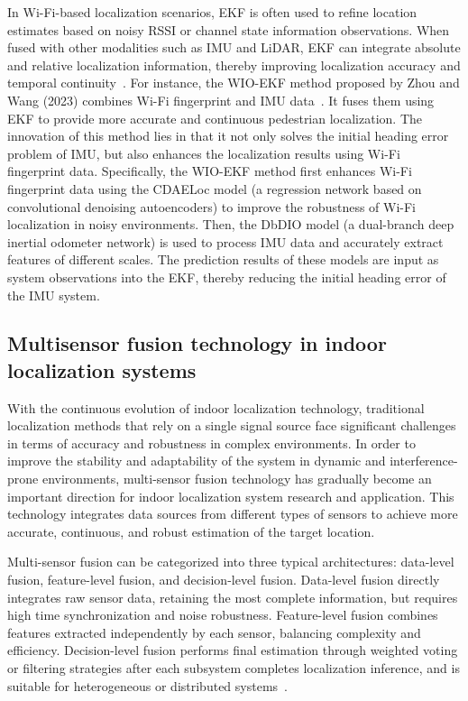 \documentclass[12pt,a4paper]{article}
\numberwithin{equation}{section}
\begin{document}
In Wi-Fi-based localization scenarios, EKF is often used to refine location
estimates based on noisy RSSI or channel state information observations. When
fused with other modalities such as IMU and LiDAR, EKF can integrate absolute
and relative localization information, thereby improving localization accuracy
and temporal continuity~\cite{laoudias2018survey}. For instance, the WIO-EKF
method proposed by Zhou and Wang (2023) combines Wi-Fi fingerprint and IMU
data~\cite{zhou2024wio}. It fuses them using EKF to provide more accurate and
continuous pedestrian localization. The innovation of this method lies in that
it not only solves the initial heading error problem of IMU, but also enhances
the localization results using Wi-Fi fingerprint data. Specifically, the WIO-EKF
method first enhances Wi-Fi fingerprint data using the CDAELoc model (a
regression network based on convolutional denoising
autoencoders) to
improve the robustness of Wi-Fi localization in noisy environments. Then, the
DbDIO model (a dual-branch deep inertial odometer network)
is used to process IMU
data and accurately extract features of different scales. The prediction results
of these models are input as system observations into the EKF, thereby reducing
the initial heading error of the IMU system.

\subsection{Multisensor fusion technology in indoor localization systems}
With the continuous evolution of indoor localization technology, traditional
localization methods that rely on a single signal source face significant
challenges in terms of accuracy and robustness in complex environments. In order
to improve the stability and adaptability of the system in dynamic and
interference-prone environments, multi-sensor fusion technology has gradually
become an important direction for indoor localization system research and
application. This technology integrates data sources from different types of
sensors to achieve more accurate, continuous, and robust estimation of the
target location.

Multi-sensor fusion can be categorized into three typical architectures:
data-level fusion, feature-level fusion, and decision-level fusion. Data-level
fusion directly integrates raw sensor data, retaining the most complete
information, but requires high time synchronization and noise
robustness. Feature-level fusion combines features extracted independently by
each sensor, balancing complexity and efficiency. Decision-level fusion performs
final estimation through weighted voting or filtering strategies after each
subsystem completes localization inference, and is suitable for heterogeneous or
distributed systems~\cite{zafari2019survey}.
\end{document}
